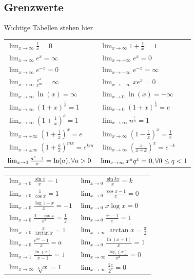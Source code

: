 \documentclass[8pt]{article}
\def\limxo{\lim_{x\to 0}}
\def\limxi{\lim_{x\to\infty}}
\def\limxn{\lim_{x\to-\infty}}
\begin{document}
\begin{multicols*}{3}
\subsection{Grenzwerte}
Wichtige Tabellen stehen hier
\begin{center}
  \begin{tabularx}{\linewidth}{XX}

    $\limxi \frac{1}{x} = 0$ & $\limxi 1 + \frac{1}{x} = 1$ \\
    $\limxi e^x = \infty$ & $\limxn e^x = 0$ \\
    $\limxi e^{-x} = 0$ & $\limxn e^{-x} = \infty$ \\
    $\limxi \frac{e^x}{x^m} = \infty$ & $\limxn xe^x = 0$ \\
    $\limxi \ln(x) = \infty$ & $\limxo \ln(x) = -\infty$ \\
    $\limxi (1+x)^{\frac{1}{x}} = 1$ & $\limxo (1+x)^{\frac{1}{x}} = e$ \\
    $\limxi (1+\frac{1}{x})^b = 1$ & $\limxi n^{\frac{1}{n}} = 1$ \\
    $\lim_{x\to\pm\infty} (1 + \frac{1}{x})^x = e$ & $\limxi (1-\frac{1}{x})^x = \frac{1}{e}$ \\
    $\lim_{x\to\pm\infty} (1 + \frac{k}{x})^{mx} = e^{km}$ & $\limxi (\frac{x}{x+k})^x = e^{-k}$ \\
    $\limxo \frac{a^x -1}{x} = \ln(a), \newline \forall a > 0$ &
    $\limxi x^a q^x = 0, \newline \forall 0 \le q < 1$ \\
  \end{tabularx}
  \begin{tabularx}{\linewidth}{XX}
    $\limxo \frac{\sin x}{x} = 1$ & $\limxo \frac{\sin kx}{x} = k$\\
    $\limxo \frac{1}{\cos x} = 1$ & $\limxo \frac{\cos x -1}{x} = 0$ \\
    $\limxo \frac{\log 1 - x}{x} = -1$ & $\limxo x \log x = 0$\\
    $\limxo \frac{1 - \cos x}{x^2} = \frac{1}{2}$ & $\limxo \frac{e^x-1}{x} = 1$ \\
    $\limxo \frac{x}{\arctan x} = 1$ & $\limxi \arctan x = \frac{\pi}{2}$ \\
    $\limxo \frac{e^{ax}-1}{x} = a$ & $\limxo \frac{\ln(x+1)}{x} = 1$ \\
    $\lim_{x\to 1} \frac{\ln(x)}{x-1} = 1$ & $\limxi \frac{\log(x)}{x^a} = 0$ \\
    $\limxi \sqrt[x]{x} = 1$ & $\limxi \frac{2x}{2^x} = 0$ \\
  \end{tabularx}
\end{center}


\end{multicols*}
\end{document}
